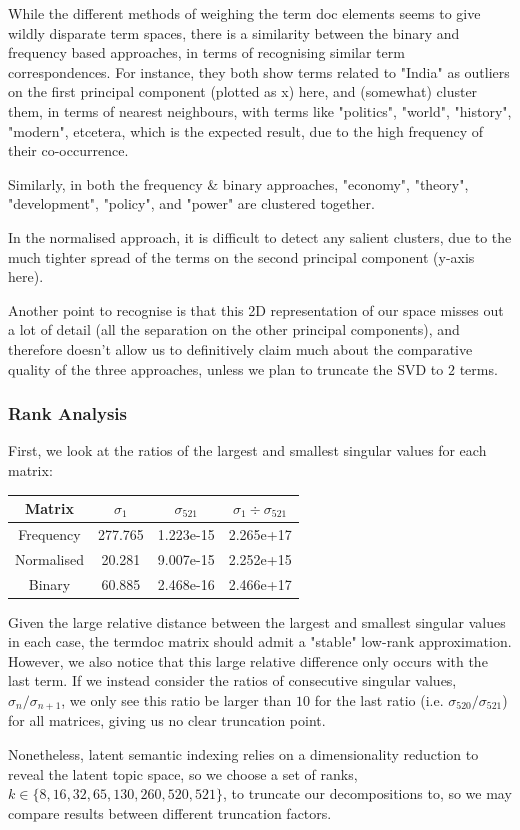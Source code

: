 \documentclass[article]{article}
\begin{document}
While the different methods of weighing the term doc elements seems to give wildly disparate term spaces, there is a similarity between the binary and frequency based approaches, in terms of recognising similar term correspondences. For instance, they both show terms related to "India" as outliers on the first principal component (plotted as x) here, and (somewhat) cluster them, in terms of nearest neighbours, with terms like "politics", "world", "history", "modern", etcetera, which is the expected result, due to the high frequency of their co-occurrence.\bigskip

Similarly, in both the frequency \& binary approaches, "economy", "theory", "development", "policy", and "power" are clustered together.\bigskip

In the normalised approach, it is difficult to detect any salient clusters, due to the much tighter spread of the terms on the second principal component (y-axis here).\bigskip

Another point to recognise is that this 2D representation of our space misses out a lot of detail (all the separation on the other principal components), and therefore doesn't allow us to definitively claim much about the comparative quality of the three approaches, unless we plan to truncate the SVD to $2$ terms.

\subsubsection{Rank Analysis} {
First, we look at the ratios of the largest and smallest singular values for each matrix:

\begin{center}
    \begin{tabular}{|c|c|c|c|}
        \hline \textbf{Matrix} & $\sigma_1$ & $\sigma_{521}$ & $\sigma_1\div\sigma_{521}$ \\
        \hline Frequency & 277.765 & 1.223e-15 & 2.265e+17 \\
        \hline Normalised & 20.281 & 9.007e-15 & 2.252e+15 \\
        \hline Binary & 60.885 & 2.468e-16 & 2.466e+17 \\
        \hline
    \end{tabular}    
\end{center}

Given the large relative distance between the largest and smallest singular values in each case, the termdoc matrix should admit a "stable" low-rank approximation. However, we also notice that this large relative difference only occurs with the last term. If we instead consider the ratios of consecutive singular values, $\sigma_n / \sigma_{n+1}$, we only see this ratio be larger than $10$ for the last ratio (i.e. $\sigma_{520}/\sigma_{521}$) for all matrices, giving us no clear truncation point.\bigskip

Nonetheless, latent semantic indexing relies on a dimensionality reduction to reveal the latent topic space, so we choose a set of ranks, $k \in \{ 8, 16, 32, 65, 130, 260, 520, 521 \}$, to truncate our decompositions to, so we may compare results between different truncation factors.
}
\end{document}

